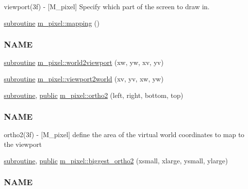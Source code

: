 \begin{DoxyCompactItemize}
\begin{DoxyCompactList}
viewport(3f) -\/ \mbox{[}M\+\_\+pixel\mbox{]} Specify which part of the screen to draw in. \end{DoxyCompactList}\item 
\hyperlink{M__stopwatch_83_8txt_acfbcff50169d691ff02d4a123ed70482}{subroutine} \hyperlink{namespacem__pixel_a84c841de62fc0addddeff305c4ede9d4}{m\+\_\+pixel\+::mapping} ()
\begin{DoxyCompactList}\small\item\em \subsubsection*{N\+A\+ME}\end{DoxyCompactList}\item 
\hyperlink{M__stopwatch_83_8txt_acfbcff50169d691ff02d4a123ed70482}{subroutine} \hyperlink{namespacem__pixel_a9d4aea8ae2eb15317b83fa03a11371b2}{m\+\_\+pixel\+::world2viewport} (xw, yw, xv, yv)
\item 
\hyperlink{M__stopwatch_83_8txt_acfbcff50169d691ff02d4a123ed70482}{subroutine} \hyperlink{namespacem__pixel_a9e23c9a3a5f3b1482986f067fbf8487f}{m\+\_\+pixel\+::viewport2world} (xv, yv, xw, yw)
\item 
\hyperlink{M__stopwatch_83_8txt_acfbcff50169d691ff02d4a123ed70482}{subroutine}, \hyperlink{M__stopwatch_83_8txt_a2f74811300c361e53b430611a7d1769f}{public} \hyperlink{namespacem__pixel_a80dece6adac704024a5a76efee697770}{m\+\_\+pixel\+::ortho2} (left, right, bottom, top)
\begin{DoxyCompactList}\small\item\em \subsubsection*{N\+A\+ME}

ortho2(3f) -\/ \mbox{[}M\+\_\+pixel\mbox{]} define the area of the virtual world coordinates to map to the viewport \end{DoxyCompactList}\item 
\hyperlink{M__stopwatch_83_8txt_acfbcff50169d691ff02d4a123ed70482}{subroutine}, \hyperlink{M__stopwatch_83_8txt_a2f74811300c361e53b430611a7d1769f}{public} \hyperlink{namespacem__pixel_accc2eab6fbc7b453afa34e1e2c834223}{m\+\_\+pixel\+::biggest\+\_\+ortho2} (xsmall, xlarge, ysmall, ylarge)
\begin{DoxyCompactList}\small\item\em \subsubsection*{N\+A\+ME}


\end{DoxyCompactList}
\end{DoxyCompactItemize}

